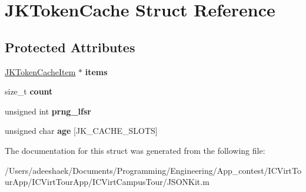 \hypertarget{struct_j_k_token_cache}{\section{J\-K\-Token\-Cache Struct Reference}
\label{struct_j_k_token_cache}
}
\subsection*{Protected Attributes}
\begin{DoxyCompactItemize}
\item 
\hypertarget{struct_j_k_token_cache_abec10755e8bb5ef8fc3a82c2e4d467c1}{\hyperlink{struct_j_k_token_cache_item}{J\-K\-Token\-Cache\-Item} $\ast$ {\bfseries items}}\label{struct_j_k_token_cache_abec10755e8bb5ef8fc3a82c2e4d467c1}

\item 
\hypertarget{struct_j_k_token_cache_a76d971a3c552bc58ba9f0d5fceae9806}{size\-\_\-t {\bfseries count}}\label{struct_j_k_token_cache_a76d971a3c552bc58ba9f0d5fceae9806}

\item 
\hypertarget{struct_j_k_token_cache_a83c88b5c53e08b332677f41a6e528572}{unsigned int {\bfseries prng\-\_\-lfsr}}\label{struct_j_k_token_cache_a83c88b5c53e08b332677f41a6e528572}

\item 
\hypertarget{struct_j_k_token_cache_a61e398deb25adbfc37b6165ae703bfe1}{unsigned char {\bfseries age} \mbox{[}J\-K\-\_\-\-C\-A\-C\-H\-E\-\_\-\-S\-L\-O\-T\-S\mbox{]}}\label{struct_j_k_token_cache_a61e398deb25adbfc37b6165ae703bfe1}

\end{DoxyCompactItemize}


The documentation for this struct was generated from the following file\-:\begin{DoxyCompactItemize}
\item 
/\-Users/adeeshaek/\-Documents/\-Programming/\-Engineering/\-App\-\_\-contest/\-I\-C\-Virt\-Tour\-App/\-I\-C\-Virt\-Tour\-App/\-I\-C\-Virt\-Campus\-Tour/J\-S\-O\-N\-Kit.\-m\end{DoxyCompactItemize}
